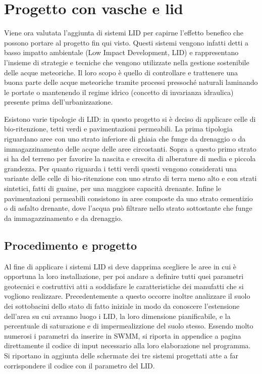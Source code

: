 \section{Progetto con vasche e lid}
Viene ora valutata l'aggiunta di sistemi LID per capirne l'effetto benefico che possono portare al progetto fin qui visto. 
Questi sistemi vengono infatti detti a basso impatto ambientale (Low Impact Development, LID) e rappresentano l’insieme di strategie e tecniche che vengono utilizzate nella gestione sostenibile delle acque meteoriche. 
Il loro scopo è quello di controllare e trattenere una buona parte delle acque meteoriche tramite processi pressoché naturali laminando le portate o mantenendo il regime idrico (concetto di invarianza idraulica) presente prima dell'urbanizzazione.

Esistono varie tipologie di LID: in questo progetto si  è deciso di applicare celle di bio-ritenzione, tetti verdi e pavimentazioni permeabili.
La prima tipologia riguardano aree con uno strato inferiore di ghiaia che funge da drenaggio o da immagazzinamento delle acque delle aree circostanti.
Sopra a questo primo strato si ha del terreno per favorire la nascita e crescita di alberature di media e piccola grandezza.
Per quanto riguarda i tetti verdi questi vengono considerati una variante delle celle di bio-ritenzione con uno strato di terra meno alto e con strati sintetici, fatti di guaine, per una maggiore capacità drenante.
Infine le pavimentazioni permeabili consistono in aree composte da uno strato cementizio o di asfalto drenante, dove l'acqua può filtrare nello strato sottostante che funge da immagazzinamento e da drenaggio.

\subsection{Procedimento e progetto}
Al fine di applicare i sistemi LID si deve dapprima scegliere le aree in cui è opportuna la loro installazione, per poi andare a definire tutti quei parametri geotecnici e costruttivi atti a soddisfare le caratteristiche dei manufatti che si vogliono realizzare.
Precedentemente a questo occorre inoltre analizzare il suolo dei sottobacini dello stato di fatto iniziale in modo da conoscere l'estensione dell'area su cui avranno luogo i LID, la loro dimensione pianificabile, e la percentuale di saturazione e di impermealizzione del suolo stesso. 
Essendo molto numerosi i parametri da inserire in SWMM, si riporta in appendice a pagina {} direttamente il codice di input necessario alla loro elaborazione nel programma. 
Si riportano in aggiunta delle schermate dei tre sistemi progettati atte a far corrispondere il codice con il parametro del LID.

